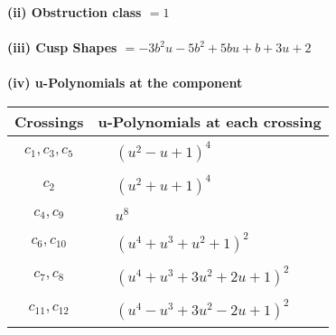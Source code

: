 \documentclass[1p]{elsarticle_modified}
\theoremstyle{definition}
\begin{document}
\flushleft \textbf{(ii) Obstruction class $= 1$}\\~\\
\flushleft \textbf{(iii) Cusp Shapes $= -3 b^2 u-5 b^2+5 b u+b+3 u+2$}\\~\\
\newpage\renewcommand{\arraystretch}{1}
\flushleft \textbf{(iv) u-Polynomials at the component}\newline \\
\begin{tabular}{m{50pt}|m{274pt}}
Crossings & \hspace{64pt}u-Polynomials at each crossing \\
\hline $$\begin{aligned}c_{1},c_{3},c_{5}\end{aligned}$$&$\begin{aligned}
&(u^2- u+1)^4
\end{aligned}$\\
\hline $$\begin{aligned}c_{2}\end{aligned}$$&$\begin{aligned}
&(u^2+u+1)^4
\end{aligned}$\\
\hline $$\begin{aligned}c_{4},c_{9}\end{aligned}$$&$\begin{aligned}
&u^8
\end{aligned}$\\
\hline $$\begin{aligned}c_{6},c_{10}\end{aligned}$$&$\begin{aligned}
&(u^4+u^3+u^2+1)^2
\end{aligned}$\\
\hline $$\begin{aligned}c_{7},c_{8}\end{aligned}$$&$\begin{aligned}
&(u^4+u^3+3 u^2+2 u+1)^2
\end{aligned}$\\
\hline $$\begin{aligned}c_{11},c_{12}\end{aligned}$$&$\begin{aligned}
&(u^4- u^3+3 u^2-2 u+1)^2
\end{aligned}$\\
\hline
\end{tabular}\\~\\
\end{document}
